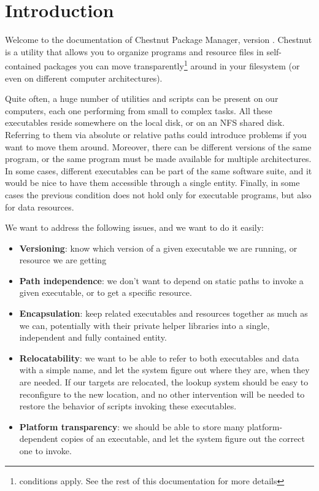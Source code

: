 \section{Introduction}

Welcome to the documentation of Chestnut Package Manager, version \version{}.
Chestnut is a utility that allows you to organize programs and resource files
in self-contained packages you can move transparently\footnote{conditions
apply. See the rest of this documentation for more details} around in your
filesystem (or even on different computer architectures).

Quite often, a huge number of utilities and scripts can be present on our
computers, each one performing from small to complex tasks.  All these
executables reside somewhere on the local disk, or on an NFS shared disk.
Referring to them via absolute or relative paths could introduce problems if
you want to move them around. Moreover, there can be different versions of the same
program, or the same program must be made available for multiple architectures.
In some cases, different executables can be part of the same software suite,
and it would be nice to have them accessible through a single entity. Finally,
in some cases the previous condition does not hold only for executable programs, but also for data resources.

We want to address the following issues, and we want to do it easily:

\begin{itemize}
\item \textbf{Versioning}: know which version of a given executable we are running, or resource
we are getting
\item \textbf{Path independence}: we don't want to depend on static paths to
invoke a given executable, or to get a specific resource.
\item \textbf{Encapsulation}: keep related executables and resources
together as much as we can, potentially with their private helper libraries
into a single, independent and fully contained entity.
\item \textbf{Relocatability}: we want to be able to refer to both executables
and data with a simple name, and let the system figure out where they are, when
they are needed. If our targets are relocated, the lookup system should be easy
to reconfigure to the new location, and no other intervention will be needed to
restore the behavior of scripts invoking these executables.
\item \textbf{Platform transparency}: we should be able to store many platform-dependent
copies of an executable, and let the system figure out the correct one to invoke.
\end{itemize}

